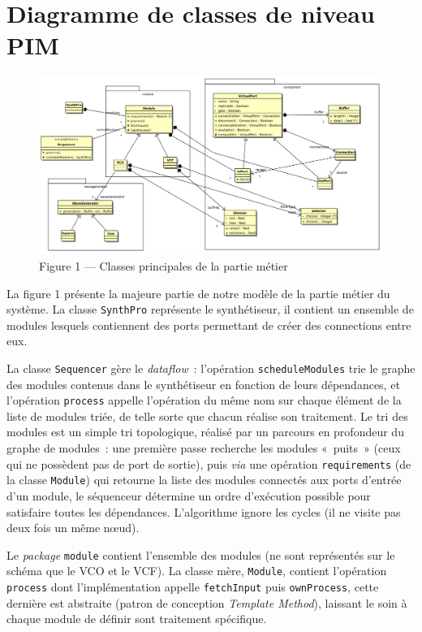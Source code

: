 \section{Diagramme de classes de niveau PIM}

\begin{figure}[htb]
\centering
\includegraphics[width=17cm]{../img/ps/business-pim.pdf}
\caption{Figure 1 — Classes principales de la partie métier}
\end{figure}

La figure 1 présente la majeure partie de notre modèle de la partie
métier du système. La classe \verb!SynthPro! représente le
synthétiseur, il contient un ensemble de modules lesquels
contiennent des ports permettant de créer des connections entre
eux.

La classe \verb!Sequencer! gère le \emph{dataflow}~: l'opération
\verb!scheduleModules! trie le graphe des modules contenus dans le
synthétiseur en fonction de leurs dépendances, et l'opération
\verb!process! appelle l'opération du même nom sur chaque élément
de la liste de modules triée, de telle sorte que chacun réalise son
traitement. Le tri des modules est un simple tri topologique,
réalisé par un parcours en profondeur du graphe de modules~: une
première passe recherche les modules «~puits~» (ceux qui ne
possèdent pas de port de sortie), puis \emph{via} une opération
\verb!requirements! (de la classe \verb!Module!) qui retourne la
liste des modules connectés aux ports d'entrée d'un module, le
séquenceur détermine un ordre d'exécution possible pour satisfaire
toutes les dépendances. L'algorithme ignore les cycles (il ne
visite pas deux fois un même nœud).

Le \emph{package} \verb!module! contient l'ensemble des modules (ne
sont représentés sur le schéma que le VCO et le VCF). La classe
mère, \verb!Module!, contient l'opération \verb!process! dont
l'implémentation appelle \verb!fetchInput! puis \verb!ownProcess!,
cette dernière est abstraite (patron de conception
\emph{Template Method}), laissant le soin à chaque module de
définir sont traitement spécifique.


